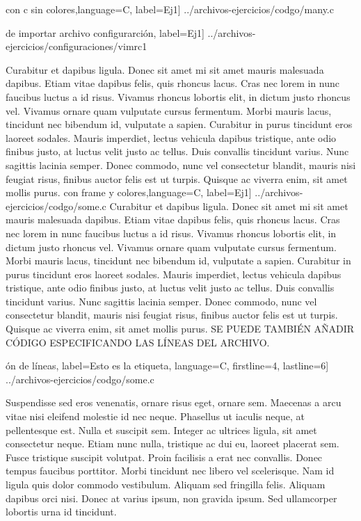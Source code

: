 \lstset{style=no-color,inputencoding=utf8/latin1}
 con c sin colores,language=C, label=Ej1] {../archivos-ejercicios/codgo/many.c}

\lstset{style=colorBB,inputencoding=utf8/latin1}
 de importar archivo configurarci\'on, label=Ej1] {../archivos-ejercicios/configuraciones/vimrc1}

Curabitur et dapibus ligula. Donec sit amet mi sit amet mauris malesuada dapibus. Etiam vitae dapibus felis, quis rhoncus lacus. Cras nec lorem in nunc faucibus luctus a id risus. Vivamus rhoncus lobortis elit, in dictum justo rhoncus vel. Vivamus ornare quam vulputate cursus fermentum. Morbi mauris lacus, tincidunt nec bibendum id, vulputate a sapien. Curabitur in purus tincidunt eros laoreet sodales. Mauris imperdiet, lectus vehicula dapibus tristique, ante odio finibus justo, at luctus velit justo ac tellus. Duis convallis tincidunt varius. Nunc sagittis lacinia semper. Donec commodo, nunc vel consectetur blandit, mauris nisi feugiat risus, finibus auctor felis est ut turpis. Quisque ac viverra enim, sit amet mollis purus.
\lstset{style=colorA-frameround,inputencoding=utf8/latin1}
 con frame y colores,language=C, label=Ej1] {../archivos-ejercicios/codgo/some.c}
Curabitur et dapibus ligula. Donec sit amet mi sit amet mauris malesuada dapibus. Etiam vitae dapibus felis, quis rhoncus lacus. Cras nec lorem in nunc faucibus luctus a id risus. Vivamus rhoncus lobortis elit, in dictum justo rhoncus vel. Vivamus ornare quam vulputate cursus fermentum. Morbi mauris lacus, tincidunt nec bibendum id, vulputate a sapien. Curabitur in purus tincidunt eros laoreet sodales. Mauris imperdiet, lectus vehicula dapibus tristique, ante odio finibus justo, at luctus velit justo ac tellus. Duis convallis tincidunt varius. Nunc sagittis lacinia semper. Donec commodo, nunc vel consectetur blandit, mauris nisi feugiat risus, finibus auctor felis est ut turpis. Quisque ac viverra enim, sit amet mollis purus.
SE PUEDE TAMBIÉN AÑADIR CÓDIGO ESPECIFICANDO LAS LÍNEAS DEL ARCHIVO.

\lstset{style=colorA,inputencoding=utf8/latin1}
\'on de l\'ineas, label=Esto es la etiqueta, language=C, firstline=4, lastline=6] {../archivos-ejercicios/codgo/some.c}

Suspendisse sed eros venenatis, ornare risus eget, ornare sem. Maecenas a arcu vitae nisi eleifend molestie id nec neque. Phasellus ut iaculis neque, at pellentesque est. Nulla et suscipit sem. Integer ac ultrices ligula, sit amet consectetur neque. Etiam nunc nulla, tristique ac dui eu, laoreet placerat sem. Fusce tristique suscipit volutpat. Proin facilisis a erat nec convallis. Donec tempus faucibus porttitor. Morbi tincidunt nec libero vel scelerisque. Nam id ligula quis dolor commodo vestibulum. Aliquam sed fringilla felis. Aliquam dapibus orci nisi. Donec at varius ipsum, non gravida ipsum. Sed ullamcorper lobortis urna id tincidunt.

